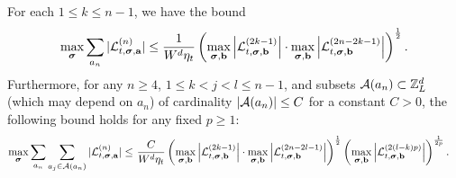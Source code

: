 


\begin{lemma} \label{ygdhmsgq}
For each $1\le k \le n-1$, we have the bound
\begin{align}\label{yi2oslxj2}
  \max_{\bsig}\sum_{a_n} |{\cal L}^{(n)}_{t, \bsig, \ba}|\le \frac 1 {W^{d}\eta_t} \left(\max_{\bsig,\mathbf{b}}  \left|{\cal L}^{(2k-1)}_{t, \bsig, \mathbf{b}}\right|\cdot \max_{\bsig,\mathbf{b}}  \left|{\cal L}^{(2n-2k-1)}_{t, \bsig, \mathbf{b} }\right|\right)^{\frac 1 2}   .
\end{align}
Furthermore, for any $n\ge 4$, $1\le k<j<l\le n-1$, and subsets $\cal A(a_n)\subset \Zn$ (which may depend on $a_n$) of cardinality $|\cal A(a_n)|\le C$ for a constant $C>0$, the following bound holds for any fixed $p\ge 1$: 
\begin{align}\label{u2jzooi-2}
   \max_{\bsig} \sum_{a_n}\sum_{a_j\in \cal A(a_n)} |{\cal L}^{(n)}_{t,\bsig, {\ba}}|\le  &~\frac{C}{W^d\eta_t} \left(\max_{\bsig,\mathbf{b}}  \left|{\cal L}^{(2k-1)}_{t, \bsig, \mathbf{b}}\right|\cdot \max_{\bsig,\mathbf{b}}  \left|{\cal L}^{(2n-2l-1)}_{t,\bsig,\mathbf{b}}\right|\right)^{\frac 1 2}   \left(\max_{\bsig,\bfb}   \left|{\cal L}^{(2(l-k)p)}_{t,\bsig, \mathbf b}\right|\right)^{\frac1{2p}} .
\end{align}
\end{lemma}


